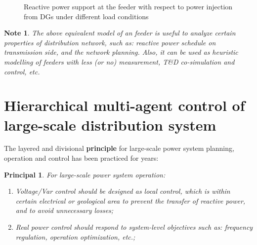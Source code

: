 \documentclass{article}
\newtheorem{note}{Note}[section]
\newtheorem*{principal}{Principal}
\begin{document}
\begin{figure}[h]
\centering
\quad
    \caption{Reactive power support at the feeder with respect to power injection from DGs under different load conditions} 
    \label{fig:qbankab}
\end{figure}

\begin{note}
The above equivalent model of an feeder is useful to analyze certain properties of distribution network, such as: reactive power schedule on transmission side, and the network planning. Also, it can be used as heuristic modelling of feeders with less (or no) measurement, T\&D co-simulation and control, etc. 

\end{note}

\section{Hierarchical multi-agent control of large-scale distribution system}\label{sec:syslvl}
The layered and divisional {\bf principle} for large-scale power system planning, operation and control has been practiced for years:
\begin{principal}\label{principal}
For large-scale power system operation:
\begin{enumerate}
    \item Voltage/Var control should be designed as local control, which is within certain electrical or geological area to prevent the transfer of reactive power, and to avoid unnecessary losses;
    \item Real power control should respond to system-level objectives such as: frequency regulation, operation optimization, etc.;
\end{enumerate}
\end{principal}
\end{document}
